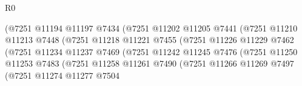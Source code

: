\begin{lexlean}{R0}
\begin{coremodule}
                                          (@7251
                                            @11194
                                            @11197
                                            @7434
                                            (@7251
                                              @11202
                                              @11205
                                              @7441
                                              (@7251
                                                @11210
                                                @11213
                                                @7448
                                                (@7251
                                                  @11218
                                                  @11221
                                                  @7455
                                                  (@7251
                                                    @11226
                                                    @11229
                                                    @7462
                                                    (@7251
                                                      @11234
                                                      @11237
                                                      @7469
                                                      (@7251
                                                        @11242
                                                        @11245
                                                        @7476
                                                        (@7251
                                                          @11250
                                                          @11253
                                                          @7483
                                                          (@7251
                                                            @11258
                                                            @11261
                                                            @7490
                                                            (@7251
                                                              @11266
                                                              @11269
                                                              @7497
                                                              (@7251
                                                                @11274
                                                                @11277
                                                                @7504

\end{coremodule}
\end{lexlean}
